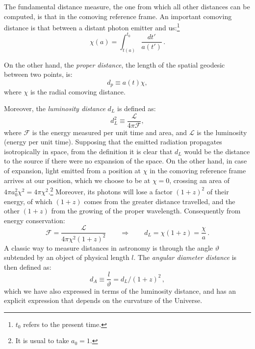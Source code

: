 The fundamental distance measure, the one from which all other distances can be computed, is that in the comoving reference frame. An important comoving distance is that between a distant photon emitter and us:\footnote{$t_0$ refers to the present time.}
\begin{equation}
\chi(a)=\int_{t(a)}^{t_0}\frac{dt'}{a(t')}\,.\label{comovingdistance}
\end{equation}

On the other hand, the \emph{proper distance}, the length of the spatial geodesic between two points, is:
\begin{equation}
d_p \equiv a(t)\chi,
\end{equation}where $\chi$ is the radial comoving distance. %

Moreover, the  \emph{luminosity distance} $d_L$ is defined as:
\begin{equation}
d_L^2 \equiv \frac{\mathcal{L}}{4 \pi \mathcal{F}},
\end{equation}where $\mathcal{F}$ is the energy measured per unit time and area, and $\mathcal{L}$ is the luminosity (energy per unit time). Supposing that the emitted radiation propagates isotropically in space, from the definition it is clear that  $d_L$ would be the distance to the source if there were no expansion of the space. On the other hand, in case of expansion, light emitted from a position at $\chi$ in the comoving reference frame arrives at our position, which we choose to be at $\chi=0$, crossing an area of $4 \pi a_0^2 \chi^2=4 \pi \chi^2$.\footnote{It is usual to take $a_0=1$.} Moreover, its photons will lose a factor $(1+z)^2$ of their energy, of which $(1+z)$ comes from the greater distance travelled, and the other $(1+z)$ from the growing of the proper wavelength. Consequently from energy conservation:
\begin{equation}
\mathcal{F} = \frac{\mathcal{L}}{4 \pi \chi^2 (1+z)^2} \qquad \Longrightarrow \qquad d_L = \chi (1+z)=\frac{\chi}{a}\,. \label{RW14}
\end{equation}
A classic way to measure distances in astronomy is through the angle $\vartheta$ subtended by an object of physical length $l$. The \emph{angular diameter distance} is then defined as:
\begin{equation}
d_A\equiv \frac{l}{\vartheta} = d_L/(1+z)^2\,,
\end{equation}which we have also expressed in terms of the luminosity distance, and has an explicit expression that depends on the curvature of the Universe.



